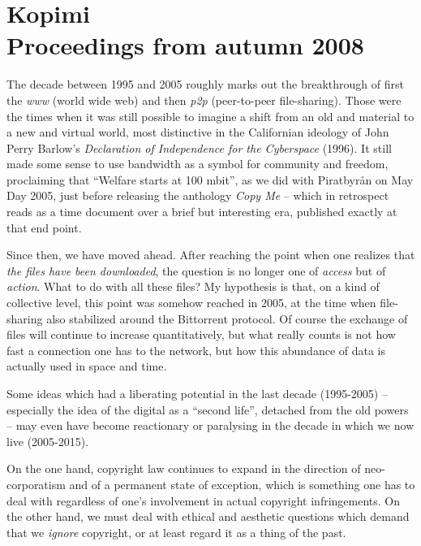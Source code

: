 \begin{savequote}
\end{savequote}
\chapter[Kopimi]{Kopimi\\ \Large{Proceedings from autumn 2008}}
\label{c:kopimi}

The decade between 1995 and 2005 roughly marks out the breakthrough of
f\hbox{}irst the \textit{www} (world wide web) and then \textit{p2p}
(peer-to-peer f\hbox{}ile-sharing).  Those were the times when it was still
possible to imagine a shift from an old and material to a new and virtual world,
most distinctive in the Californian ideology of John Perry Barlow's
\textit{Declaration of Independence for the Cyberspace} (1996). It still made
some sense to use bandwidth as a symbol for community and freedom, proclaiming
that ``Welfare starts at 100 mbit'', as we did with Piratbyrån on May Day 2005,
just before releasing the anthology \textit{Copy Me} – which in retrospect reads
as a time document over a brief but interesting era, published exactly at that
end point.

Since then, we have moved ahead. After reaching the point when one realizes that
\textit{the f\hbox{}iles have been downloaded}, the question is no longer one of
\textit{access} but of \textit{action}. What to do with all these f\hbox{}iles?
My hypothesis is that, on a kind of collective level, this point was somehow
reached in 2005, at the time when f\hbox{}ile-sharing also stabilized around the
Bittorrent protocol. Of course the exchange of f\hbox{}iles will continue to
increase quantitatively, but what really counts is not how fast a connection one
has to the network, but how this abundance of data is actually used in space and
time.

Some ideas which had a liberating potential in the last decade (1995-2005) –
especially the idea of the digital as a ``second life'', detached from the old
powers – may even have become reactionary or paralysing in the decade in which
we now live (2005-2015).

On the one hand, copyright law continues to expand in the direction of
neo-corporatism and of a permanent state of exception, which is something one
has to deal with regardless of one's involvement in actual copyright
infringements. On the other hand, we must deal with ethical and aesthetic
questions which demand that we \textit{ignore} copyright, or at least regard it
as a thing of the past.

